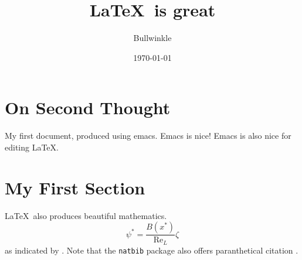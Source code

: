 \documentclass{article}
\begin{document}
\title{\LaTeX\ is great}
\author{Bullwinkle}
\date{\today}
\maketitle

\tableofcontents

\section{On Second Thought}

My first document, produced using emacs.  Emacs is nice!
Emacs is also nice for editing \LaTeX.

\section{My First Section}

\LaTeX\ also  produces beautiful mathematics.
\begin{equation}
\psi^\ast = \frac{B(x^\ast)}{\mathrm{Re}_L}\zeta
\end{equation}
as indicated by \citet{bullwinkle.1990}.  Note that the
\texttt{natbib} package also offers paranthetical citation
\citep{bullwinkle.1990}. 



\end{document}

